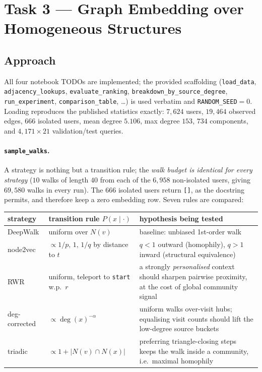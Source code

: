 \section{Task 3 --- Graph Embedding over Homogeneous Structures}
\label{p1:sec:main}

\subsection{Approach}
\label{p1:sec:approach}

All four notebook TODOs are implemented; the provided scaffolding (\texttt{load\_data},
\texttt{adjacency\_lookups}, \texttt{evaluate\_ranking}, \texttt{breakdown\_by\_source\_degree},
\texttt{run\_experiment}, \texttt{comparison\_table}, \dots) is used verbatim and
\texttt{RANDOM\_SEED}${}=0$.  Loading reproduces the published statistics exactly:
$7{,}624$ users, $19{,}464$ observed edges, $666$ isolated users, mean degree $5.106$,
max degree $153$, $734$ components, and $4{,}171\times 21$ validation/test queries.

\paragraph{\texttt{sample\_walks}.}
A strategy is nothing but a transition rule; the \emph{walk budget is identical for every
strategy} ($10$ walks of length $40$ from each of the $6{,}958$ non-isolated users, giving
$69{,}580$ walks in every run).  The $666$ isolated users return \texttt{[]}, as the
docstring permits, and therefore keep a zero embedding row.  Seven rules are compared:

\begin{center}\small
\begin{tabular}{@{}llp{6.6cm}@{}}
\toprule
strategy & transition rule $P(x \mid \cdot)$ & hypothesis being tested \\
\midrule
DeepWalk & uniform over $N(v)$ & baseline: unbiased 1st-order walk \\
node2vec & $\propto 1/p,\,1,\,1/q$ by distance to $t$ & $q<1$ outward (homophily), $q>1$ inward (structural equivalence) \\
RWR & uniform, teleport to \texttt{start} w.p.\ $r$ & a strongly \emph{personalised} context should sharpen pairwise proximity, at the cost of global community signal \\
deg-corrected & $\propto \deg(x)^{-\alpha}$ & uniform walks over-visit hubs; equalising visit counts should lift the low-degree source buckets \\
triadic & $\propto 1 + |N(v)\cap N(x)|$ & preferring triangle-closing steps keeps the walk inside a community, i.e.\ maximal homophily \\
\bottomrule
\end{tabular}
\end{center}

